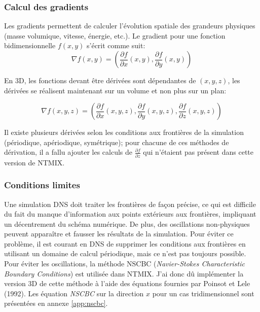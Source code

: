 \subsubsection{Calcul des gradients}%

Les gradients permettent de calculer l'évolution spatiale des grandeurs physiques (masse volumique, vitesse, énergie, etc.). Le gradient pour une fonction bidimensionnelle $f(x,y)$ s'écrit comme suit:
$$\nabla f(x,y) =\left(\frac{\partial f}{\partial x}(x,y),\frac{\partial f}{\partial y}(x,y)\right) $$

En 3D, les fonctions devant être dérivées sont dépendantes de $(x,y,z)$, les dérivées se réalisent maintenant sur un volume et non plus sur un plan:

$$ \nabla f(x,y,z) =\left(\frac{\partial f}{\partial x}(x,y,z),\frac{\partial f}{\partial y}(x,y,z),\frac{\partial f}{\partial z}(x,y,z)\right)$$


Il existe plusieurs dérivées selon les conditions aux frontières de la simulation (périodique, apériodique, symétrique); pour chacune de ces méthodes de dérivation, il a fallu ajouter les calculs de $\frac{\partial f}{\partial z}$ qui n'étaient pas présent dans cette version de NTMIX.




\subsubsection{Conditions limites}\label{sec:nsbc}
Une simulation DNS doit traiter les frontières de façon précise, ce qui est difficile du fait du manque d'information aux points extérieurs aux frontières, impliquant un décentrement du schéma numérique. De plus, des oscillations non-physiques peuvent apparaître et fausser les résultats de la simulation. Pour éviter ce problème, il est courant en DNS de supprimer les conditions aux frontières en utilisant un domaine de calcul périodique, mais ce n'est pas toujours possible. Pour éviter les oscillations, la méthode NSCBC (\textit{Navier-Stokes Characteristic Boundary Conditions}) est utilisée dans NTMIX. J'ai donc dû implémenter la version 3D de cette méthode à l'aide des équations fournies par Poinsot et Lele (1992)\cite{POINSOT1992104}. Les équation \textit{NSCBC} sur la direction $x$ pour un cas tridimensionnel sont présentées en annexe \ref{app:nscbc}. 
\cite{baritaud1996direct}


